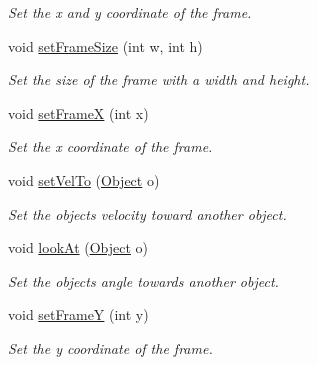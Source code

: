 \begin{DoxyCompactItemize}
\begin{DoxyCompactList}\small\item\em Set the x and y coordinate of the frame. \end{DoxyCompactList}\item 
\mbox{\label{classObject_a2ec266f6f1f6bdc3c3cd001f2dc6daef}} 
void \hyperlink{classObject_a2ec266f6f1f6bdc3c3cd001f2dc6daef}{set\+Frame\+Size} (int w, int h)
\begin{DoxyCompactList}\small\item\em Set the size of the frame with a width and height. \end{DoxyCompactList}\item 
\mbox{\label{classObject_ad4ad32edcec36e9fa63290070c991575}} 
void \hyperlink{classObject_ad4ad32edcec36e9fa63290070c991575}{set\+FrameX} (int x)
\begin{DoxyCompactList}\small\item\em Set the x coordinate of the frame. \end{DoxyCompactList}\item 
\mbox{\label{classObject_afa2ef385cd0c7e76134d4a11b8643d38}} 
void \hyperlink{classObject_afa2ef385cd0c7e76134d4a11b8643d38}{set\+Vel\+To} (\hyperlink{classObject}{Object} o)
\begin{DoxyCompactList}\small\item\em Set the object\textquotesingle{}s velocity toward another object. \end{DoxyCompactList}\item 
\mbox{\label{classObject_a327a4b938d5f97db0ca6b9c8722f6e35}} 
void \hyperlink{classObject_a327a4b938d5f97db0ca6b9c8722f6e35}{look\+At} (\hyperlink{classObject}{Object} o)
\begin{DoxyCompactList}\small\item\em Set the object\textquotesingle{}s angle towards another object. \end{DoxyCompactList}\item 
\mbox{\label{classObject_adbbc257d38397971e16016287b653952}} 
void \hyperlink{classObject_adbbc257d38397971e16016287b653952}{set\+FrameY} (int y)
\begin{DoxyCompactList}\small\item\em Set the y coordinate of the frame. \end{DoxyCompactList}\item 

\end{DoxyCompactItemize}

